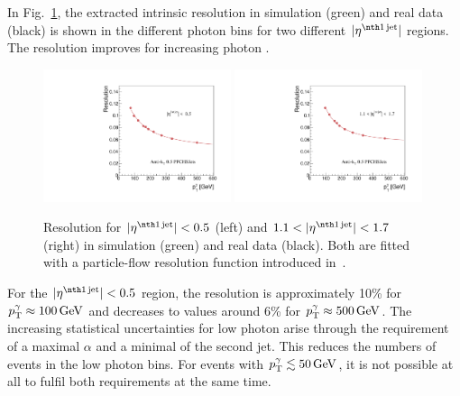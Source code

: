 In Fig.~\ref{fig:ResolutionOfPtgamma}, the extracted intrinsic resolution in simulation (green) and real data (black) is shown in the different photon \pt bins for two different $|\etafirstjet|$ regions.
The resolution improves for increasing photon \pt. 
\begin{figure}[!b]
  \centering
    \includegraphics[width=0.49\textwidth]{figures/resolution/methodology/Resolution_for_1_eta_bin_PFCHS_mc_RMS99.pdf}
    \includegraphics[width=0.49\textwidth]{figures/resolution/methodology/Resolution_for_3_eta_bin_PFCHS_mc_RMS99.pdf}
  \caption{Resolution for $|\etafirstjet| < 0.5$ (left) and $1.1<|\etafirstjet| < 1.7$ (right) in simulation (green) and real data (black). Both are fitted with a particle-flow resolution function introduced in~\cite{bib:CMS:JERCPaper_2011}.}  
  \label{fig:ResolutionOfPtgamma}
\end{figure}
For the $|\etafirstjet|<0.5$ region, the resolution is approximately 10\% for $p_{\text{T}}^{\gamma} \approx 100\,\text{Ge}\kern-0.06667em\text{V}$ and decreases to values around 6\% for  
$p_{\text{T}}^{\gamma} \approx 500\,\text{Ge}\kern-0.06667em\text{V}$.
The increasing statistical uncertainties for low photon \pt arise through the requirement of a maximal $\alpha$ and a minimal \pt of the second jet. 
This reduces the numbers of events in the low photon \pt bins. 
For events with ${p}_\mathrm{T}^{\gamma} \lesssim 50\,\text{Ge}\kern-0.06667em\text{V}$, it is not possible at all to fulfil both requirements at the same time.


